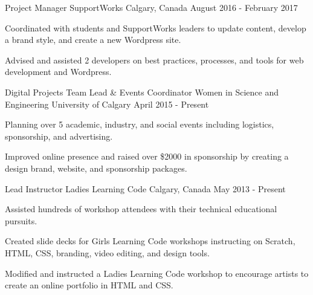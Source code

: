 \begin{cventries}
  \cventry
    {Project Manager}
    {SupportWorks}
    {Calgary, Canada}
    {August 2016 - February 2017}
    {
      \begin{cvitems}
        \item {Coordinated with students and SupportWorks leaders to update content, develop a brand style, and create a new Wordpress site.}
        \item {Advised and assisted 2 developers on best practices, processes, and tools for web development and Wordpress.}
      \end{cvitems}
    }
  \cventry
    {Digital Projects Team Lead \& Events Coordinator}
    {Women in Science and Engineering}
    {University of Calgary}
    {April 2015 - Present}
    {
      \begin{cvitems}
        \item {Planning over 5 academic, industry, and social events including logistics, sponsorship, and advertising.}
        \item {Improved online presence and raised over \$2000 in sponsorship by creating a design brand, website, and sponsorship packages.}
      \end{cvitems}
    }
  \cventry
    {Lead Instructor}
    {Ladies Learning Code}
    {Calgary, Canada}
    {May 2013 - Present}
    {
      \begin{cvitems}
        \item {Assisted hundreds of workshop attendees with their technical educational pursuits.}
        \item {Created slide decks for Girls Learning Code workshops instructing on Scratch, HTML, CSS, branding, video editing, and design tools.}
        \item {Modified and instructed a Ladies Learning Code workshop to encourage artists to create an online portfolio in HTML and CSS.}
      \end{cvitems}
    }
\end{cventries}
